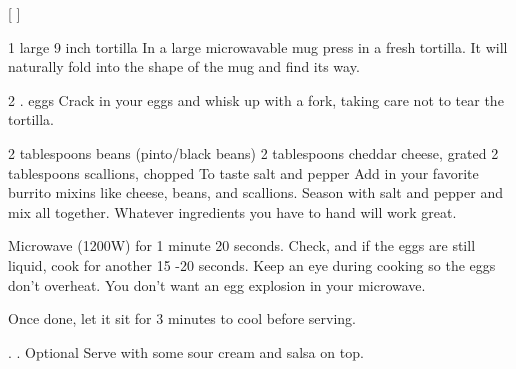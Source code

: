 
[
]

\begin{step}
1 large 9 inch tortilla
\method
In a large microwavable mug press in a fresh tortilla. It will naturally fold into the shape of the mug and find its way.
\end{step}

\begin{step}
2 . eggs
\method
Crack in your eggs and whisk up with a fork, taking care not to tear the tortilla.
\end{step}

\begin{step}
2 tablespoons beans (pinto/black beans)
2 tablespoons cheddar cheese, grated
2 tablespoons scallions, chopped
To taste salt and pepper
\method
Add in your favorite burrito mixins like cheese, beans, and scallions. Season with salt and pepper and mix all together. Whatever ingredients you have to hand will work great.

Microwave (1200W) for 1 minute 20 seconds. Check, and if the eggs are still liquid, cook for another 15 -20 seconds. Keep an eye during cooking so the eggs don’t overheat. You don’t want an egg explosion in your microwave.

Once done, let it sit for 3 minutes to cool before serving.

\end{step}

\begin{step}
. . Optional
\method
Serve with some sour cream and salsa on top.
\end{step}